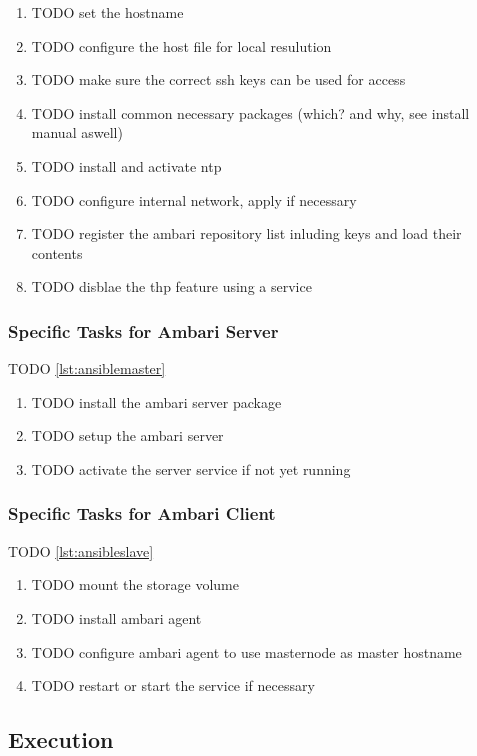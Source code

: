 \begin{enumerate}
    \item TODO set the hostname
    \item TODO configure the host file for local resulution
    \item TODO make sure the correct ssh keys can be used for access
    \item TODO install common necessary packages (which? and why, see install manual aswell)
    \item TODO install and activate ntp
    \item TODO configure internal network, apply if necessary
    \item TODO register the ambari repository list inluding keys and load their contents
    \item TODO disblae the thp feature using a service
    
\end{enumerate}

\subsubsection{Specific Tasks for Ambari Server}
TODO \vref{lst:ansiblemaster}

\begin{enumerate}
    \item TODO install the ambari server package
    \item TODO setup the ambari server
    \item TODO activate the server service if not yet running
\end{enumerate}

\subsubsection{Specific Tasks for Ambari Client}
TODO \vref{lst:ansibleslave}

\begin{enumerate}
    \item TODO mount the storage volume
    \item TODO install ambari agent
    \item TODO configure ambari agent to use masternode as master hostname
    \item TODO restart or start the service if necessary
\end{enumerate}

\subsection{Execution}

